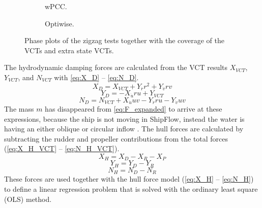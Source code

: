 \begin{figure}[H]
     \centering
     \begin{subfigure}[b]{0.49\textwidth}
         \centering
         
        \caption{wPCC.}
        \label{fig:VCT_phase_plot_wPCC}
     \end{subfigure}
     \hfill
     \begin{subfigure}[b]{0.49\textwidth}
        \centering
        
        \caption{Optiwise.}
        \label{fig:VCT_phase_plot_optiwise}
     \end{subfigure}
        \caption{Phase plots of the zigzag tests together with the coverage of the VCTs and extra state VCTs.}
        \label{fig:phase_plots}
\end{figure}

The hydrodynamic damping forces are calculated from the VCT results $X_{VCT}$, $Y_{VCT}$, and $N_{VCT}$ 
with \autoref{eq:X_D} -- \autoref{eq:N_D}.
\begin{equation}
    \label{eq:X_D}
    X_{D} = X_{VCT} + Y_{\dot{r}} r^{2} + Y_{\dot{v}} r v
\end{equation}
\begin{equation}
    \label{eq:Y_D}
    Y_{D} = - X_{\dot{u}} r u + Y_{VCT}
\end{equation}
\begin{equation}
    \label{eq:N_D}
    N_{D} = N_{VCT} + X_{\dot{u}} u v - Y_{\dot{r}} r u - Y_{\dot{v}} u v
\end{equation}
The mass $m$ has disappeared from \autoref{eq:F_expanded} to arrive at these expressions, because the ship is not moving in ShipFlow, instead the water is having an either oblique or circular inflow \citep{choud}.
The hull forces are calculated by subtracting the rudder and propeller contributions from the total forces (\autoref{eq:X_H_VCT} -- \autoref{eq:N_H_VCT}).
\begin{equation}
    \label{eq:X_H_VCT}
    X_H = X_D - X_R - X_P
\end{equation}
\begin{equation}
    \label{eq:Y_H_VCT}
    Y_H = Y_D - Y_R
\end{equation}
\begin{equation}
    \label{eq:N_H_VCT}
    N_H = N_D - N_R
\end{equation}
These forces are used together with the hull force model (\autoref{eq:X_H} -- \autoref{eq:N_H}) to define a linear regression problem that is solved with the ordinary least square (OLS) method. 